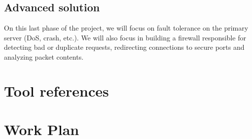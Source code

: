 \documentclass[a4paper,titlepage,11pt]{article}
\begin{document}
\subsection{Advanced solution}
On this last phase of the project, we will focus on fault tolerance on the primary server (DoS, crash, etc.).
We will also focus in building a firewall responsible for detecting bad or duplicate requests,
redirecting connections to secure ports and analyzing packet contents.

\section{Tool references}

\section{Work Plan}
\end{document}
